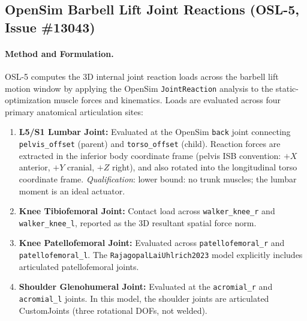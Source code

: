 \documentclass[11pt,a4paper]{article}
\begin{document}
\subsection{OpenSim Barbell Lift Joint Reactions (OSL-5, Issue \#13043)}\label{sec:opensim-joint-reactions}
\paragraph{Method and Formulation.}
OSL-5 computes the 3D internal joint reaction loads across the barbell lift motion window
by applying the OpenSim \texttt{JointReaction} analysis to the static-optimization muscle forces and kinematics.
Loads are evaluated across four primary anatomical articulation sites:
\begin{enumerate}[noitemsep]
\item \textbf{L5/S1 Lumbar Joint:} Evaluated at the OpenSim \texttt{back} joint connecting \texttt{pelvis\_offset} (parent)
  and \texttt{torso\_offset} (child). Reaction forces are extracted in the inferior body coordinate frame
  (pelvis ISB convention: $+X$ anterior, $+Y$ cranial, $+Z$ right), and also rotated into the longitudinal torso coordinate frame.
  \textit{Qualification}: lower bound: no trunk muscles; the lumbar moment is an ideal actuator.
\item \textbf{Knee Tibiofemoral Joint:} Contact load across \texttt{walker\_knee\_r} and \texttt{walker\_knee\_l},
  reported as the 3D resultant spatial force norm.
\item \textbf{Knee Patellofemoral Joint:} Evaluated across \texttt{patellofemoral\_r} and \texttt{patellofemoral\_l}.
  The \texttt{RajagopalLaiUhlrich2023} model explicitly includes articulated patellofemoral joints.
\item \textbf{Shoulder Glenohumeral Joint:} Evaluated at the \texttt{acromial\_r} and \texttt{acromial\_l} joints.
  In this model, the shoulder joints are articulated CustomJoints (three rotational DOFs, not welded).
\end{enumerate}
\end{document}
